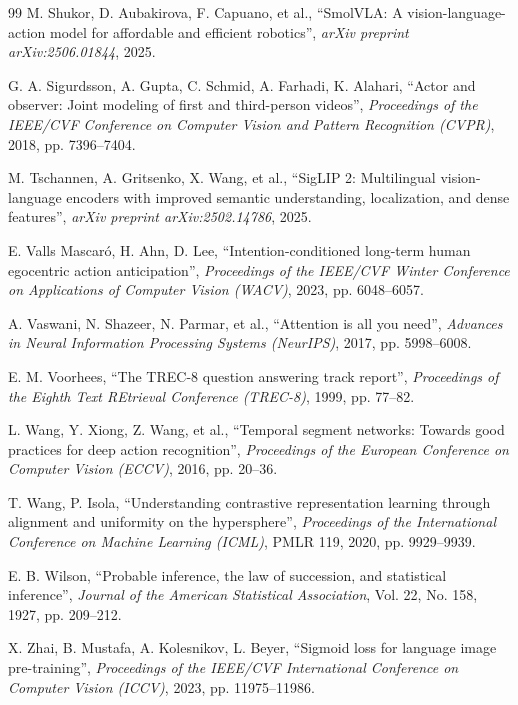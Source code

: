 \documentclass[a4paper,oneside]{report}
\begin{document}
{\begin{thebibliography}{99}
M. Shukor, D. Aubakirova, F. Capuano, et al., ``SmolVLA: A vision-language-action model for affordable and efficient robotics'', \emph{arXiv preprint arXiv:2506.01844}, 2025.

G. A. Sigurdsson, A. Gupta, C. Schmid, A. Farhadi, K. Alahari, ``Actor and observer: Joint modeling of first and third-person videos'', \emph{Proceedings of the IEEE/CVF Conference on Computer Vision and Pattern Recognition (CVPR)}, 2018, pp. 7396--7404.

M. Tschannen, A. Gritsenko, X. Wang, et al., ``SigLIP 2: Multilingual vision-language encoders with improved semantic understanding, localization, and dense features'', \emph{arXiv preprint arXiv:2502.14786}, 2025.

E. Valls Mascar\'o, H. Ahn, D. Lee, ``Intention-conditioned long-term human egocentric action anticipation'', \emph{Proceedings of the IEEE/CVF Winter Conference on Applications of Computer Vision (WACV)}, 2023, pp. 6048--6057.

A. Vaswani, N. Shazeer, N. Parmar, et al., ``Attention is all you need'', \emph{Advances in Neural Information Processing Systems (NeurIPS)}, 2017, pp. 5998--6008.

E. M. Voorhees, ``The TREC-8 question answering track report'', \emph{Proceedings of the Eighth Text REtrieval Conference (TREC-8)}, 1999, pp. 77--82.

L. Wang, Y. Xiong, Z. Wang, et al., ``Temporal segment networks: Towards good practices for deep action recognition'', \emph{Proceedings of the European Conference on Computer Vision (ECCV)}, 2016, pp. 20--36.

T. Wang, P. Isola, ``Understanding contrastive representation learning through alignment and uniformity on the hypersphere'', \emph{Proceedings of the International Conference on Machine Learning (ICML)}, PMLR 119, 2020, pp. 9929--9939.

E. B. Wilson, ``Probable inference, the law of succession, and statistical inference'', \emph{Journal of the American Statistical Association}, Vol. 22, No. 158, 1927, pp. 209--212.

X. Zhai, B. Mustafa, A. Kolesnikov, L. Beyer, ``Sigmoid loss for language image pre-training'', \emph{Proceedings of the IEEE/CVF International Conference on Computer Vision (ICCV)}, 2023, pp. 11975--11986.


\end{thebibliography}}
\end{document}
